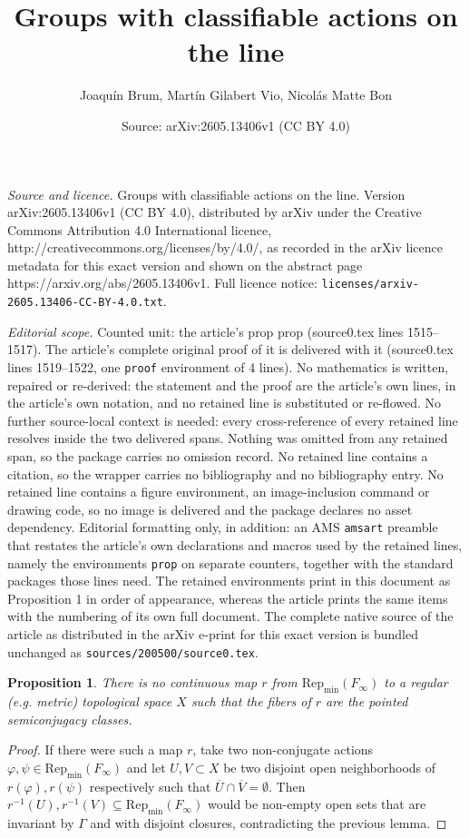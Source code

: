 \documentclass[10pt,a4paper]{amsart}
\title{Groups with classifiable actions on the line}
\author{Joaqu\'in Brum, Mart\'in Gilabert Vio, Nicol\'as Matte Bon}
\date{Source: arXiv:2605.13406v1 (CC BY 4.0)}
\newtheorem{prop}{Proposition}
\begin{document}
\maketitle

\noindent\emph{Source and licence.} Groups with classifiable actions on the line. Version arXiv:2605.13406v1 (CC BY 4.0), distributed by arXiv under the Creative Commons Attribution 4.0 International licence, http://creativecommons.org/licenses/by/4.0/, as recorded in the arXiv licence metadata for this exact version and shown on the abstract page https://arxiv.org/abs/2605.13406v1. Full licence notice: \texttt{licenses/arxiv-2605.13406-CC-BY-4.0.txt}.\par\smallskip

\noindent\textit{Editorial scope.} Counted unit: the article's prop prop (source0.tex lines 1515--1517). The article's complete original proof of it is delivered with it (source0.tex lines 1519--1522, one \texttt{proof} environment of 4 lines). No mathematics is written, repaired or re-derived: the statement and the proof are the article's own lines, in the article's own notation, and no retained line is substituted or re-flowed.  No further source-local context is needed: every cross-reference of every retained line resolves inside the two delivered spans.  Nothing was omitted from any retained span, so the package carries no omission record.  No retained line contains a citation, so the wrapper carries no bibliography and no bibliography entry.  No retained line contains a figure environment, an image-inclusion command or drawing code, so no image is delivered and the package declares no asset dependency.  Editorial formatting only, in addition: an AMS \texttt{amsart} preamble that restates the article's own declarations and macros used by the retained lines, namely the environments \texttt{prop} on separate counters, together with the standard packages those lines need.  The retained environments print in this document as Proposition 1 in order of appearance, whereas the article prints the same items with the numbering of its own full document.  The complete native source of the article as distributed in the arXiv e-print for this exact version is bundled unchanged as \texttt{sources/200500/source0.tex}.
\begin{prop}
There is no continuous map $r$ from $\mathrm{Rep}_\mathrm{min}(F_\infty)$ to a regular (e.g. metric) topological space $X$ such that the fibers of $r$ are the pointed semiconjugacy classes.
\end{prop}

\begin{proof}
If there were such a map $r$, take two non-conjugate actions $\varphi, \psi \in \mathrm{Rep}_\mathrm{min}(F_\infty)$ and let $U, V \subset X$ be two disjoint open neighborhoods of $r(\varphi), r(\psi)$ respectively such that $\overline{U} \cap \overline{V} = \emptyset$. Then $r^{-1}(U), r^{-1}(V) \subseteq \mathrm{Rep}_\mathrm{min}(F_\infty)$ would be non-empty open sets that are invariant by $\Gamma$ and with disjoint closures, contradicting the previous lemma.
\qedhere
\end{proof}
\end{document}
